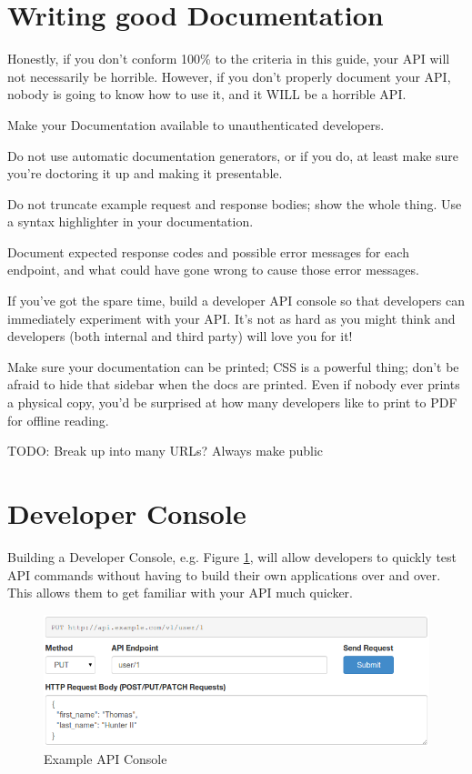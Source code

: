 \documentclass{book}
\begin{document}
\section{Writing good Documentation}

Honestly, if you don't conform 100\% to the criteria in this guide, your API will not necessarily be horrible. However, if you don't properly document your API, nobody is going to know how to use it, and it WILL be a horrible API.

Make your Documentation available to unauthenticated developers.

Do not use automatic documentation generators, or if you do, at least make sure you're doctoring it up and making it presentable.

Do not truncate example request and response bodies; show the whole thing. Use a syntax highlighter in your documentation.

Document expected response codes and possible error messages for each endpoint, and what could have gone wrong to cause those error messages.

If you've got the spare time, build a developer API console so that developers can immediately experiment with your API. It's not as hard as you might think and developers (both internal and third party) will love you for it!

Make sure your documentation can be printed; CSS is a powerful thing; don't be afraid to hide that sidebar when the docs are printed. Even if nobody ever prints a physical copy, you'd be surprised at how many developers like to print to PDF for offline reading.

TODO: Break up into many URLs? Always make public


\section{Developer Console}

Building a Developer Console, e.g. Figure \ref{fig:devconsole}, will allow developers to quickly test API commands without having to build their own applications over and over. This allows them to get familiar with your API much quicker.

\begin{figure}[ht!]
\centering
\includegraphics[width=120mm]{images/api-console.png}
\caption{Example API Console}
\label{fig:devconsole}
\end{figure}
\end{document}
